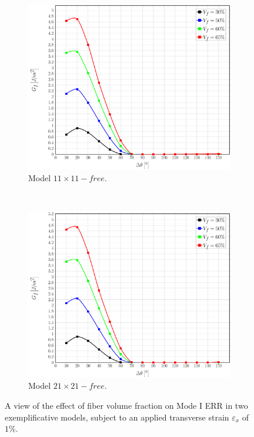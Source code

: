 \documentclass[review]{elsarticle}
\begin{document}
\begin{figure}[!h]
\centering
    \begin{subfigure}[b]{0.475\textwidth}
        \includegraphics[width=\textwidth]{vf-smallermodel-GI.pdf}
        \caption{Model $11\times 11-free$.}\label{subfig:volfracsmallerMI}
    \end{subfigure} ~
    \begin{subfigure}[b]{0.475\textwidth}
        \includegraphics[width=\textwidth]{vf-biggermodel-GI.pdf}
        \caption{Model $21\times 21-free$.}\label{subfig:volfracbiggerMI}
    \end{subfigure}

\caption{A view of the effect of fiber volume fraction on Mode I ERR in two exemplificative models, subject to an applied transverse strain $\varepsilon_{x}$ of $1\%$.}\label{fig:volumefractionMI}
\end{figure}
\end{document}
